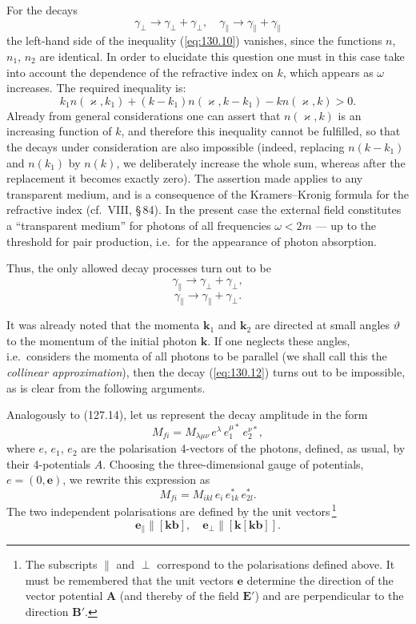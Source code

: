 
For the decays
\[
\gamma_\perp \to \gamma_\perp + \gamma_\perp,\quad \gamma_\parallel \to \gamma_\parallel + \gamma_\parallel
\]
the left-hand side of the inequality (\ref{eq:130.10}) vanishes, since the functions $n$, $n_1$, $n_2$ are identical. In order to elucidate this question one must in this case take into account the dependence of the refractive index on $k$, which appears as $\omega$ increases. The required inequality is:
\[
k_1 n(\varkappa, k_1) + (k - k_1) n(\varkappa, k - k_1) - kn(\varkappa, k) > 0.
\]
Already from general considerations one can assert that $n(\varkappa, k)$ is an increasing function of $k$, and therefore this inequality cannot be fulfilled, so that the decays under consideration are also impossible (indeed, replacing $n(k - k_1)$ and $n(k_1)$ by $n(k)$, we deliberately increase the whole sum, whereas after the replacement it becomes exactly zero). The assertion made applies to any transparent medium, and is a consequence of the Kramers--Kronig formula for the refractive index (cf.\ VIII, \S\,84). In the present case the external field constitutes a ``transparent medium'' for photons of all frequencies $\omega < 2m$ --- up to the threshold for pair production, i.e.\ for the appearance of photon absorption.

Thus, the only allowed decay processes turn out to be
\begin{equation}
\gamma_\parallel \to \gamma_\perp + \gamma_\perp,
\label{eq:130.11}
\end{equation}
\begin{equation}
\gamma_\parallel \to \gamma_\parallel + \gamma_\perp.
\label{eq:130.12}
\end{equation}

It was already noted that the momenta $\mathbf{k}_1$ and $\mathbf{k}_2$ are directed at small angles $\vartheta$ to the momentum of the initial photon $\mathbf{k}$. If one neglects these angles, i.e.\ considers the momenta of all photons to be parallel (we shall call this the \emph{collinear approximation}), then the decay (\ref{eq:130.12}) turns out to be impossible, as is clear from the following arguments.

Analogously to (127.14), let us represent the decay amplitude in the form
\[
M_{fi} = M_{\lambda\mu\nu}\,e^\lambda\, e_1^{\mu*}\, e_2^{\nu*},
\]
where $e$, $e_1$, $e_2$ are the polarisation 4-vectors of the photons, defined, as usual, by their 4-potentials $A$. Choosing the three-dimensional gauge of potentials, $e = (0, \mathbf{e})$, we rewrite this expression as
\[
M_{fi} = M_{ikl}\,e_i\, e_{1k}^*\, e_{2l}^*.
\]
The two independent polarisations are defined by the unit vectors\,\footnote{The subscripts $\parallel$ and $\perp$ correspond to the polarisations defined above. It must be remembered that the unit vectors $\mathbf{e}$ determine the direction of the vector potential $\mathbf{A}$ (and thereby of the field $\mathbf{E}'$) and are perpendicular to the direction $\mathbf{B}'$.}
\begin{equation}
\mathbf{e}_\parallel \parallel [\mathbf{k}\mathbf{b}],\quad \mathbf{e}_\perp \parallel [\mathbf{k}[\mathbf{k}\mathbf{b}]].
\label{eq:130.13}
\end{equation}

